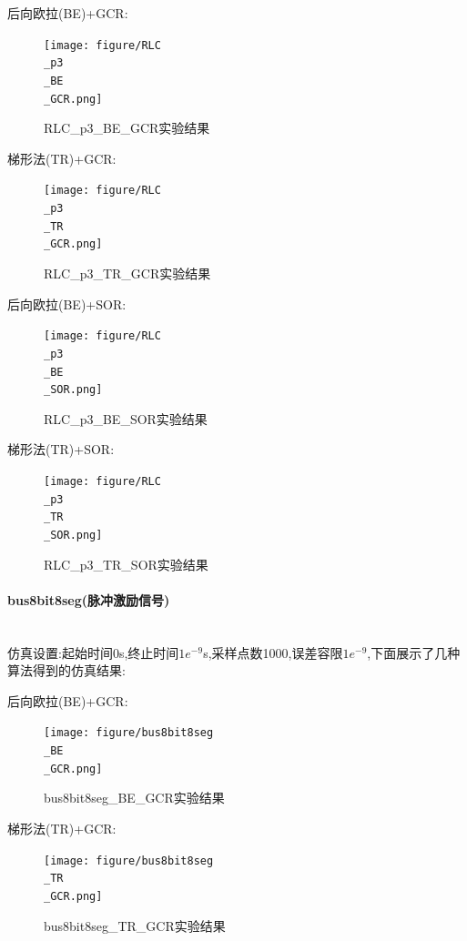 \documentclass[12pt]{article}
\newcommand{\subsubsubsection}[1]{\paragraph{#1}\mbox{}\\}
\begin{document}
\begin{sloppypar}
后向欧拉(BE)+GCR:

\begin{figure}[H]
  \centering
  \texttt{[image: figure/RLC\\\_p3\\\_BE\\\_GCR.png]}
  \caption{RLC\_p3\_BE\_GCR实验结果}
\end{figure}

梯形法(TR)+GCR:

\begin{figure}[H]
  \centering
  \texttt{[image: figure/RLC\\\_p3\\\_TR\\\_GCR.png]}
  \caption{RLC\_p3\_TR\_GCR实验结果}
\end{figure}

后向欧拉(BE)+SOR:

\begin{figure}[H]
  \centering
  \texttt{[image: figure/RLC\\\_p3\\\_BE\\\_SOR.png]}
  \caption{RLC\_p3\_BE\_SOR实验结果}
\end{figure}

梯形法(TR)+SOR:

\begin{figure}[H]
  \centering
  \texttt{[image: figure/RLC\\\_p3\\\_TR\\\_SOR.png]}
  \caption{RLC\_p3\_TR\_SOR实验结果}
\end{figure}

\subsubsubsection{bus8bit8seg(脉冲激励信号)}
\qquad 仿真设置:起始时间0s,终止时间$1e^{-9}$s,采样点数1000,误差容限$1e^{-9}$,下面展示了几种算法得到的仿真结果:

后向欧拉(BE)+GCR:

\begin{figure}[H]
  \centering
  \texttt{[image: figure/bus8bit8seg\\\_BE\\\_GCR.png]}
  \caption{bus8bit8seg\_BE\_GCR实验结果}
\end{figure}

梯形法(TR)+GCR:

\begin{figure}[H]
  \centering
  \texttt{[image: figure/bus8bit8seg\\\_TR\\\_GCR.png]}
  \caption{bus8bit8seg\_TR\_GCR实验结果}
\end{figure}


\end{sloppypar}
\end{document}
